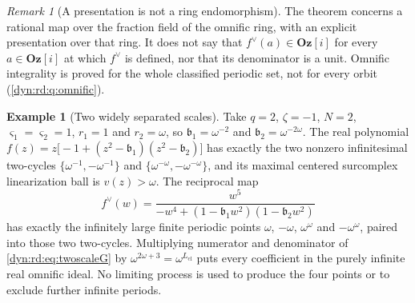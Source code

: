 \documentclass[11pt,letterpaper]{article}
\theoremstyle{definition}
\newtheorem{example}[example]{Example}
\theoremstyle{remark}
\newtheorem{remark}[remark]{Remark}
\newcommand{\Oz}{\mathbf{Oz}}
\numberwithin{equation}{section}
\begin{document}
\begin{remark}[A presentation is not a ring endomorphism]
\label{dyn:rd:rem:presentation}
The theorem concerns a rational map over the fraction field of the omnific
ring, with an explicit presentation over that ring. It does not say that
$f^{\vee}(a)\in\Oz[i]$ for every $a\in\Oz[i]$ at which $f^{\vee}$ is
defined, nor that its denominator is a unit. Omnific integrality is proved
for the whole classified periodic set, not for every orbit
(\cref{dyn:rd:q:omnific}).
\end{remark}

\begin{example}[Two widely separated scales]\label{dyn:rd:ex:twoscale}
Take $q=2$, $\zeta=-1$, $N=2$, $\varsigma_1=\varsigma_2=1$, $r_1=1$ and
$r_2=\omega$, so $\mathfrak b_1=\omega^{-2}$ and
$\mathfrak b_2=\omega^{-2\omega}$. The real polynomial
$f(z)=z\bigl[-1+(z^{2}-\mathfrak b_1)(z^{2}-\mathfrak b_2)\bigr]$ has
exactly the two nonzero infinitesimal two-cycles
$\{\omega^{-1},-\omega^{-1}\}$ and $\{\omega^{-\omega},-\omega^{-\omega}\}$,
and its maximal centered surcomplex linearization ball is $v(z)>\omega$.
The reciprocal map
\begin{equation}\label{dyn:rd:eq:twoscaleG}
 f^{\vee}(w)=\frac{w^{5}}{-w^{4}+(1-\mathfrak b_1w^{2})(1-\mathfrak b_2w^{2})}
\end{equation}
has exactly the infinitely large finite periodic points $\omega$, $-\omega$,
$\omega^{\omega}$ and $-\omega^{\omega}$, paired into those two two-cycles.
Multiplying numerator and denominator of \eqref{dyn:rd:eq:twoscaleG} by
$\omega^{2\omega+3}=\omega^{L_{\mathrm{cl}}}$ puts every coefficient in the
purely infinite real omnific ideal. No limiting process is used to produce
the four points or to exclude further infinite periods.
\end{example}
\end{document}
